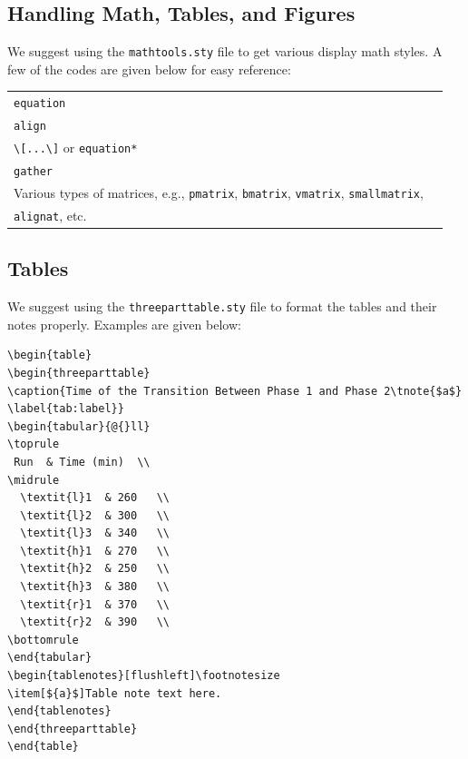 \documentclass[]{imag-ms-template}
\begin{document}
\subsection{Handling Math, Tables, and Figures}

We suggest using the \verb!mathtools.sty! file to get various 
display math styles. A few of the codes are given below for easy
reference:

\bigskip

\noindent\begin{tabular}{@{}ll}
\toprule
\verb!equation!\\
\verb!align!\\
\verb!\[...\]! or \verb!equation*!\\
\verb!gather!\\
Various types of matrices, e.g., \verb!pmatrix!, \verb!bmatrix!,
\verb!vmatrix!, \verb!smallmatrix!,\\
\verb!alignat!, etc.\\
\bottomrule
\end{tabular}


\subsection{Tables}  

We suggest using the \verb!threeparttable.sty! file to format the tables
and their notes properly. Examples are given below:

\begin{verbatim}
\begin{table}
\begin{threeparttable}
\caption{Time of the Transition Between Phase 1 and Phase 2\tnote{$a$}
\label{tab:label}}
\begin{tabular}{@{}ll}
\toprule
 Run  & Time (min)  \\
\midrule
  \textit{l}1  & 260   \\
  \textit{l}2  & 300   \\
  \textit{l}3  & 340   \\
  \textit{h}1  & 270   \\
  \textit{h}2  & 250   \\
  \textit{h}3  & 380   \\
  \textit{r}1  & 370   \\
  \textit{r}2  & 390   \\
\bottomrule
\end{tabular}
\begin{tablenotes}[flushleft]\footnotesize
\item[${a}$]Table note text here.
\end{tablenotes}
\end{threeparttable}
\end{table}
\end{verbatim}
\end{document}
